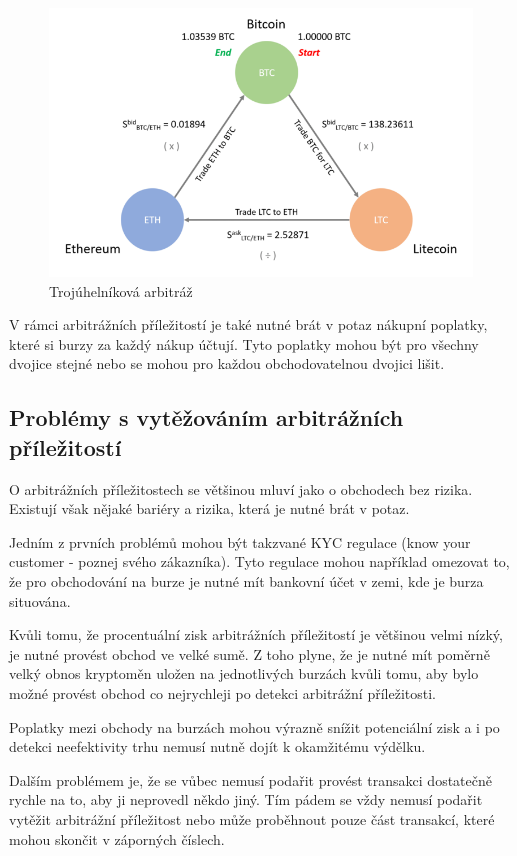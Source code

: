 \documentclass[thesis=B,czech]{FITthesis}[2019/03/21]
\begin{document}
\begin{figure}\centering
	\includegraphics[width=1\textwidth]{images/ZMENIT-triangle.png}
	\caption{Trojúhelníková arbitráž}\label{triangle_arbitrage}
\end{figure}
V rámci arbitrážních příležitostí je také nutné brát v potaz nákupní poplatky, které si burzy za každý nákup účtují. Tyto poplatky mohou být pro všechny dvojice stejné nebo se mohou pro každou obchodovatelnou dvojici lišit.  

\subsection{Problémy s vytěžováním arbitrážních příležitostí}
O arbitrážních příležitostech se většinou mluví jako o obchodech bez rizika. Existují však nějaké bariéry a rizika, která je nutné brát v potaz.

Jedním z prvních problémů mohou být takzvané KYC regulace (know your customer - poznej svého zákazníka). Tyto regulace mohou například omezovat to, že pro obchodování na burze je nutné mít bankovní účet v zemi, kde je burza situována.

Kvůli tomu, že procentuální zisk arbitrážních příležitostí je většinou velmi nízký, je nutné provést obchod ve velké sumě. Z toho plyne, že je nutné mít poměrně velký obnos kryptoměn uložen na jednotlivých burzách kvůli tomu, aby bylo možné provést obchod co nejrychleji po detekci arbitrážní příležitosti. 

Poplatky mezi obchody na burzách mohou výrazně snížit potenciální zisk a i po detekci neefektivity trhu nemusí nutně dojít k okamžitému výdělku.  

Dalším problémem je, že se vůbec nemusí podařit provést transakci dostatečně rychle na to, aby ji neprovedl někdo jiný. Tím pádem se vždy nemusí podařit vytěžit arbitrážní příležitost nebo může proběhnout pouze část transakcí, které mohou skončit v záporných číslech.
\end{document}
